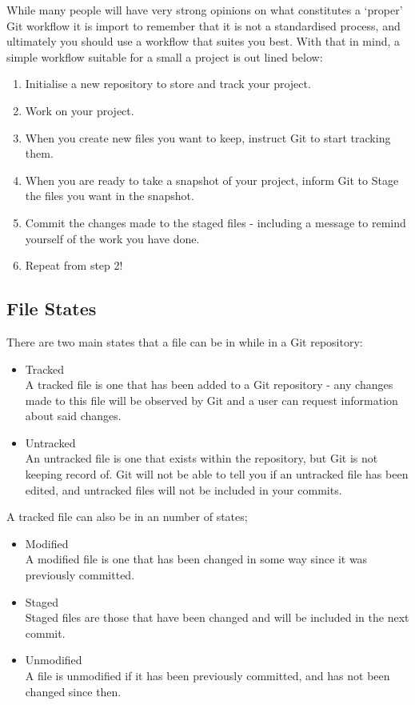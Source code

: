 \documentclass[11pt, a4paper, titlepage]{article}
\begin{document}
While many people will have very strong opinions on what constitutes a
`proper' Git workflow it is import to remember that it is not a standardised
process, and ultimately you should use a workflow that suites you best.
With that in mind, a simple workflow suitable for a small a project is out
lined below:

\begin{enumerate}
\item Initialise a new repository to store and track your project.
\item Work on your project.
\item When you create new files you want to keep, instruct Git to start
tracking them.
\item When you are ready to take a snapshot of your project, inform Git to
Stage the files you want in the snapshot.
\item Commit the changes made to the staged files - including a message to
remind yourself of the work you have done.
\item Repeat from step 2!
\end{enumerate}

\subsection{File States}
There are two  main states that a file can be in while in a Git repository:
\begin{itemize}
\item Tracked\\
A tracked file is one that has been added to a Git repository
- any changes made to this file will be observed by Git and a user can request
  information about said changes.
\item Untracked\\
An untracked file is one that exists within the repository, but Git is not
keeping record of.
Git will not be able to tell you if an untracked file has been edited, and
untracked files will not be included in your commits.
\end{itemize}

A tracked file can also be in an number of states;
\begin{itemize}
\item Modified\\ 
A modified file is one that has been changed in some way since it was
previously committed.
\item Staged\\
Staged files are those that have been changed and will be included in the next
commit.
\item Unmodified\\
A file is unmodified if it has been previously committed, and has not been
changed since then.
\end{itemize}
\end{document}
